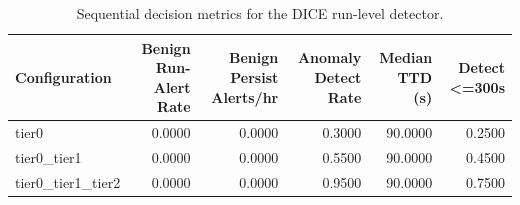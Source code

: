 \begin{table}[t]
\centering
\caption{Sequential decision metrics for the DICE run-level detector.}
\label{tab:dice_sequential_metrics}
\footnotesize
\begin{tabular}{lrrrrr}
\toprule
Configuration & Benign Run-Alert Rate & Benign Persist Alerts/hr & Anomaly Detect Rate & Median TTD (s) & Detect <=300s \\
\midrule
tier0 & 0.0000 & 0.0000 & 0.3000 & 90.0000 & 0.2500 \\
tier0_tier1 & 0.0000 & 0.0000 & 0.5500 & 90.0000 & 0.4500 \\
tier0_tier1_tier2 & 0.0000 & 0.0000 & 0.9500 & 90.0000 & 0.7500 \\
\bottomrule
\end{tabular}

\end{table}
